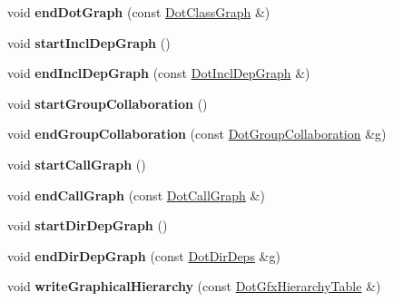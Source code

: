 \begin{DoxyCompactItemize}
void {\bfseries end\+Dot\+Graph} (const \mbox{\hyperlink{class_dot_class_graph}{Dot\+Class\+Graph}} \&)
\item 
\mbox{\label{class_r_t_f_generator_af71f39a74552eca540f9ce3ec6ecaaaf}} 
void {\bfseries start\+Incl\+Dep\+Graph} ()
\item 
\mbox{\label{class_r_t_f_generator_a0d0f1c8866d426ab365991e625655294}} 
void {\bfseries end\+Incl\+Dep\+Graph} (const \mbox{\hyperlink{class_dot_incl_dep_graph}{Dot\+Incl\+Dep\+Graph}} \&)
\item 
\mbox{\label{class_r_t_f_generator_a1cca2a1e8279bfe2a81c5c175f3e8a3e}} 
void {\bfseries start\+Group\+Collaboration} ()
\item 
\mbox{\label{class_r_t_f_generator_a7da95182ca80804b84d0fcd6db5d1d2f}} 
void {\bfseries end\+Group\+Collaboration} (const \mbox{\hyperlink{class_dot_group_collaboration}{Dot\+Group\+Collaboration}} \&g)
\item 
\mbox{\label{class_r_t_f_generator_a337a29f3c9a3031dd9926d56be1a3732}} 
void {\bfseries start\+Call\+Graph} ()
\item 
\mbox{\label{class_r_t_f_generator_ad99bf9b3a8b9221c89d0c8bb5e5665e5}} 
void {\bfseries end\+Call\+Graph} (const \mbox{\hyperlink{class_dot_call_graph}{Dot\+Call\+Graph}} \&)
\item 
\mbox{\label{class_r_t_f_generator_ae1d2a7d98e8b0933b8000b7ba646fe08}} 
void {\bfseries start\+Dir\+Dep\+Graph} ()
\item 
\mbox{\label{class_r_t_f_generator_ad8d3f8ef96f02dc4d0bb75e7ebd2a28e}} 
void {\bfseries end\+Dir\+Dep\+Graph} (const \mbox{\hyperlink{class_dot_dir_deps}{Dot\+Dir\+Deps}} \&g)
\item 
\mbox{\label{class_r_t_f_generator_ad14ce0697f892a9bac69cabf734fb057}} 
void {\bfseries write\+Graphical\+Hierarchy} (const \mbox{\hyperlink{class_dot_gfx_hierarchy_table}{Dot\+Gfx\+Hierarchy\+Table}} \&)
\item 

\end{DoxyCompactItemize}
